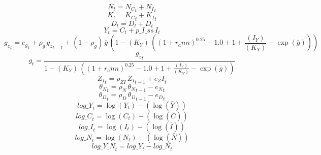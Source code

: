 \begin{dmath}
{{N}}_{t}={{N_C}}_{t}+{{N_I}}_{t}
\end{dmath}
\begin{dmath}
{{K}}_{t}={{K_C}}_{t}+{{K_I}}_{t}
\end{dmath}
\begin{dmath}
{{D}}_{t}={{D}}_{t}+{{D}}_{t}
\end{dmath}
\begin{dmath}
{{Y}}_{t}={{C}}_{t}+{p\_I\_ss}\, {{I}}_{t}
\end{dmath}
\begin{dmath}
{{g_z}}_{t}={{e_g}}_{t}+{{\rho_g}}\, {{g_z}}_{t-1}+\left(1-{{\rho_g}}\right)\, {{\overline{g}}}\, \left(1-{(K_Y)}\, \left(\left(1+{{r_ann}}\right)^{0.25}-1.0+1+\frac{{(I_Y)}}{{(K_Y)}}-\exp\left({{\overline{g}}}\right)\right)\right)
\end{dmath}
\begin{dmath}
{{g}}_{t}=\frac{{{g_z}}_{t}}{1-{(K_Y)}\, \left(\left(1+{{r_ann}}\right)^{0.25}-1.0+1+\frac{{(I_Y)}}{{(K_Y)}}-\exp\left({{\overline{g}}}\right)\right)}
\end{dmath}
\begin{dmath}
{{Z_I}}_{t}={{\rho_{ZI}}}\, {{Z_I}}_{t-1}+{{e_ZI}}_{t}
\end{dmath}
\begin{dmath}
{{\theta_N}}_{t}={{\rho_N}}\, {{\theta_N}}_{t-1}-{{e_N}}_{t}
\end{dmath}
\begin{dmath}
{{\theta_D}}_{t}={{\rho_D}}\, {{\theta_D}}_{t-1}-{{e_D}}_{t}
\end{dmath}
\begin{dmath}
{log\_Y}_{t}=\log\left({{Y}}_{t}\right)-(\log\left(\bar{{Y}}\right))
\end{dmath}
\begin{dmath}
{log\_C}_{t}=\log\left({{C}}_{t}\right)-(\log\left(\bar{{C}}\right))
\end{dmath}
\begin{dmath}
{log\_I}_{t}=\log\left({{I}}_{t}\right)-(\log\left(\bar{{I}}\right))
\end{dmath}
\begin{dmath}
{log\_N}_{t}=\log\left({{N}}_{t}\right)-(\log\left(\bar{{N}}\right))
\end{dmath}
\begin{dmath}
{log\_Y\_N}_{t}={log\_Y}_{t}-{log\_N}_{t}
\end{dmath}
